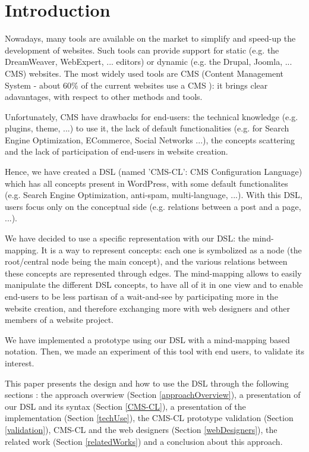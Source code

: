 \section{Introduction}
Nowadays, many tools are available on the market to simplify and speed-up the development of websites. Such tools can provide support for static (e.g. the DreamWeaver, WebExpert, ... editors) or dynamic (e.g. the Drupal, Joomla, ... CMS) websites. The most widely used tools are CMS (Content Management System - about 60\% of the current websites use a CMS \cite{cmsRepartition}): it brings clear adavantages\cite{cmsAdvDraw}, with respect to other methods and tools.

Unfortunately, CMS have drawbacks for end-users: the technical knowledge (e.g. plugins, theme, ...) to use it, the lack of default functionalities (e.g. for Search Engine Optimization, ECommerce, Social Networks ...), the concepts scattering and the lack of participation of end-users in website creation.

Hence, we have created a DSL\cite{dslDefine} (named 'CMS-CL': CMS Configuration Language) which has all concepts present in WordPress, with some default functionalites (e.g. Search Engine Optimization, anti-spam, multi-language, ...). With this DSL, users focus only on the conceptual side (e.g. relations between a post and a page, ...).

We have decided to use a specific representation with our DSL: the mind-mapping. It is a way to represent concepts: each one is symbolized as a node (the root/central node being the main concept), and the various relations between these concepts are represented through edges. The mind-mapping allows to easily manipulate the different DSL concepts, to have all of it in one view and to enable end-users to be less partisan of a wait-and-see by participating more in the website creation, and therefore exchanging more with web designers and other members of a website project.

We have implemented a prototype using our DSL with a mind-mapping based notation. Then, we made an experiment of this tool with end users, to validate its interest.

This paper presents the design and how to use the DSL through the following sections : the approach overwiew (Section \ref{approachOverview}), a presentation of our DSL and its syntax (Section \ref{CMS-CL}), a presentation of the implementation (Section \ref{techUse}), the CMS-CL prototype validation (Section \ref{validation}), CMS-CL and the web designers (Section \ref{webDesigners}), the related work (Section \ref{relatedWorks}) and a conclusion about this approach.